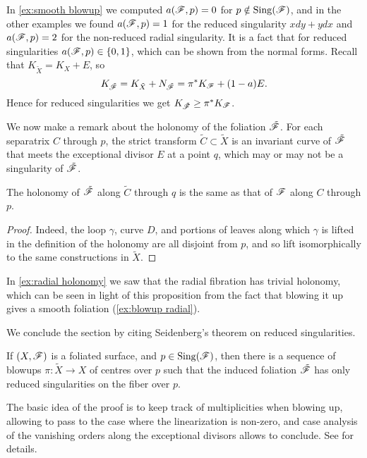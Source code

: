 In \cref{ex:smooth blowup} we computed $a(\mathscr{F},p)=0$ for
$p\notin\operatorname{Sing}(\mathscr{F})$, and in the other examples we found $a(\mathscr{F},p)=1$ for the
reduced singularity $xdy+ydx$ and $a(\mathscr{F},p)=2$ for the non-reduced radial
singularity. It is a fact that for reduced singularities $a(\mathscr{F},p)\in\{0,1\}$,
which can be shown from the normal forms. Recall that $K_{\tilde X}=K_X+E$, so
\begin{equation*}
    K_{\tilde{\mathscr{F}}}
        = K_{\tilde X}+N_{\tilde{\mathscr{F}}}
        = \pi^*K_{\mathscr{F}}+(1-a)E.
\end{equation*}
Hence for reduced singularities we get $K_{\tilde{\mathscr{F}}}\ge\pi^*K_{\mathscr{F}}$.

We now make a remark about the holonomy of the foliation $\tilde{\mathscr{F}}$. For each
separatrix $C$ through $p$, the strict transform $\tilde C\subset\tilde X$ is an
invariant curve of $\tilde{\mathscr{F}}$ that meets the exceptional divisor $E$ at a
point $q$, which may or may not be a singularity of $\tilde{\mathscr{F}}$.

\begin{proposition}\label{prop:blowup holonomy}
    The holonomy of $\tilde{\mathscr{F}}$ along $\tilde C$ through $q$ is the same as
    that of $\mathscr{F}$ along $C$ through $p$.
\end{proposition}

\begin{proof}
    Indeed, the loop $\gamma$, curve $D$, and portions of leaves along which
    $\gamma$ is lifted in the definition of the holonomy are all disjoint from
    $p$, and so lift isomorphically to the same constructions in $\tilde X$.
\end{proof}

\begin{example}
    In \cref{ex:radial holonomy} we saw that the radial fibration has trivial
    holonomy, which can be seen in light of this proposition from the fact that
    blowing it up gives a smooth foliation (\cref{ex:blowup radial}).
\end{example}

We conclude the section by citing Seidenberg's theorem on reduced singularities.

\begin{theorem}\label{thm:seidenberg}
    If $(X,\mathscr{F})$ is a foliated surface, and $p\in\operatorname{Sing}(\mathscr{F})$, then there is
    a sequence of blowups $\pi:\tilde X\to X$ of centres over $p$ such that the
    induced foliation $\tilde{\mathscr{F}}$ has only reduced singularities on the fiber
    over $p$.
\end{theorem}

The basic idea of the proof is to keep track of multiplicities when blowing up,
allowing to pass to the case where the linearization is non-zero, and case
analysis of the vanishing orders along the exceptional divisors allows to
conclude. See \cite[\S1]{brunella_book} for details.
